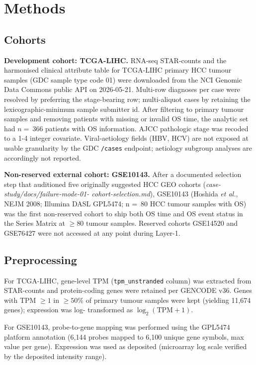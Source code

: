 \documentclass[12pt]{article}
\begin{document}
\section{Methods}

\subsection{Cohorts}

\textbf{Development cohort: TCGA-LIHC.}
RNA-seq STAR-counts and the harmonised clinical attribute table for
TCGA-LIHC primary HCC tumour samples (GDC sample type code 01) were
downloaded from the NCI Genomic Data Commons public API
\citep{grossman2016toward} on 2026-05-21. Multi-row diagnoses per
case were resolved by preferring the stage-bearing row; multi-aliquot
cases by retaining the lexicographic-minimum sample submitter id.
After filtering to primary tumour samples and removing patients with
missing or invalid OS time, the analytic set had $n =~366$ patients
with OS information. AJCC pathologic stage was recoded to a 1-4
integer covariate. Viral-aetiology fields (HBV, HCV) are not exposed
at usable granularity by the GDC \texttt{/cases} endpoint; aetiology
subgroup analyses are accordingly not reported.

\textbf{Non-reserved external cohort: GSE10143.}
After a documented selection step that auditioned five originally
suggested HCC GEO cohorts (\emph{case-study/docs/failure-mode-01-
cohort-selection.md}), GSE10143 (Hoshida \emph{et al.}, NEJM
2008\citep{hoshida2008gene}; Illumina DASL GPL5474; n =~80 HCC tumour
samples with OS) was the first non-reserved cohort to ship both OS
time and OS event status in the Series Matrix at $\geq 80$ tumour
samples. Reserved cohorts GSE14520\citep{roessler2010unique} and
GSE76427 were not accessed at any point during Layer-1.

\subsection{Preprocessing}

For TCGA-LIHC, gene-level TPM (\texttt{tpm\_unstranded} column) was
extracted from STAR-counts and protein-coding genes were retained per
GENCODE v36. Genes with TPM $\geq 1$ in $\geq 50\%$ of primary tumour
samples were kept (yielding 11{,}674 genes); expression was log-
transformed as $\log_2(\text{TPM}+1)$.

For GSE10143, probe-to-gene mapping was performed using the GPL5474
platform annotation (6{,}144 probes mapped to 6{,}100 unique gene
symbols, max value per gene). Expression was used as deposited
(microarray log scale verified by the deposited intensity range).
\end{document}
